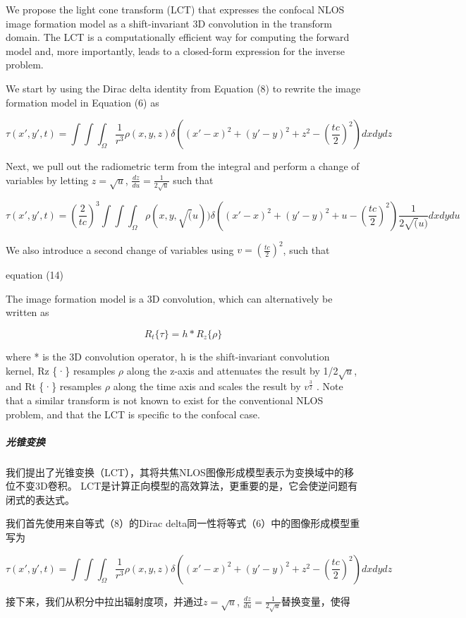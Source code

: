 \documentclass[11pt]{article}
\begin{document}
We propose the light cone transform (LCT) that expresses the confocal
NLOS image formation model as a shift-invariant 3D convolution in the
transform domain. The LCT is a computationally efficient way for
computing the forward model and, more importantly, leads to a
closed-form expression for the inverse problem.

We start by using the Dirac delta identity from Equation (8) to rewrite
the image formation model in Equation (6) as

\[\tau(x',y',t)=\int\int\int_{\Omega}\frac{1}{r^{3}}\rho(x,y,z)\delta((x'-x)^{2}+(y'-y)^{2}+z^{2}-(\frac{tc}{2})^{2})dxdydz\]

Next, we pull out the radiometric term from the integral and perform a
change of variables by letting \(z=\sqrt{u}\),
\(\frac{dz}{du}=\frac{1}{2\sqrt{u}}\) such that

\[\tau(x',y',t)=(\frac{2}{tc})^{3}\int\int\int_{\Omega}\rho(x,y,\sqrt(u))\delta((x'-x)^{2}+(y'-y)^{2}+u-(\frac{tc}{2})^{2})\frac{1}{2\sqrt(u)}dxdydu\]

We also introduce a second change of variables using
\(v=({\frac{tc}{2}})^{2}\), such that

 equation (14)

The image formation model is a 3D convolution, which can alternatively
be written as

\[R_{t}\{\tau\}=h*R_{z}\{\rho\}\]

where * is the 3D convolution operator, h is the shift-invariant
convolution kernel, Rz \{·\} resamples \(\rho\) along the z-axis and
attenuates the result by 1/2\(\sqrt{u}\), and Rt \{·\} resamples
\(\rho\) along the time axis and scales the result by
\(v^{\frac{3}{2}}\) . Note that a similar transform is not known to
exist for the conventional NLOS problem, and that the LCT is specific to
the confocal case.

    \subparagraph{光锥变换}\label{ux5149ux9525ux53d8ux6362}

我们提出了光锥变换（LCT），其将共焦NLOS图像形成模型表示为变换域中的移位不变3D卷积。
LCT是计算正向模型的高效算法，更重要的是，它会使逆问题有闭式的表达式。

我们首先使用来自等式（8）的Dirac
delta同一性将等式（6）中的图像形成模型重写为

\[\tau(x',y',t)=\int\int\int_{\Omega}\frac{1}{r^{3}}\rho(x,y,z)\delta((x'-x)^{2}+(y'-y)^{2}+z^{2}-(\frac{tc}{2})^{2})dxdydz\]

接下来，我们从积分中拉出辐射度项，并通过\(z=\sqrt{u}\),
\(\frac{dz}{du}=\frac{1}{2\sqrt{u}}\)替换变量，使得
\end{document}
